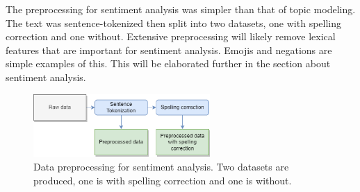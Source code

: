 The preprocessing for sentiment analysis was simpler than that of topic modeling. The text was sentence-tokenized then split into two datasets, one with spelling correction and one without. Extensive preprocessing will likely remove lexical features that are important for sentiment analysis. Emojis and negations are simple examples of this. This will be elaborated further in the section about sentiment analysis.

\begin{figure}[h]
    \centering
    \includegraphics[width=0.6\textwidth]{resources/preprocessing_sentiment_analysis.png}
    \caption{Data preprocessing for sentiment analysis. Two datasets are produced, one is with spelling correction and one is without.}
    \label{fig:preprocessing_sentiment_analysis}
\end{figure}